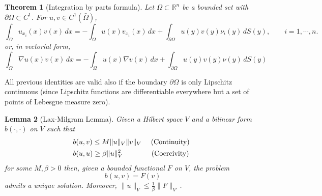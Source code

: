 \documentclass{article}
\newtheorem{thm}{Theorem}[section]
\newtheorem{lemma}[thm]{Lemma}
\begin{document}
\begin{thm}[Integration by parts formula] \label{thm:by_parts}
Let $\Omega \subset \mathbb{R}^n$ be a bounded set with $\partial\Omega \subset C^1$. For $u, v \in C^1(\bar{\Omega})$,
\[
\int_\Omega u_{x_i}(x)v(x)\,dx = -\int_\Omega u(x)v_{x_i}(x)\,dx + \int_{\partial\Omega} u(y)v(y)\nu_i(y)\,dS(y), \qquad i = 1, \cdots, n.
\]
or, in vectorial form,
\[
\int_\Omega \nabla u(x)v(x)\,dx = -\int_\Omega u(x)\nabla v(x)\,dx + \int_{\partial\Omega} u(y)v(y)\nu(y)\,dS(y)
\]
\end{thm}


All previous identities are valid also if the boundary $\partial\Omega$ is only Lipschitz continuous (since Lipschitz functions are differentiable everywhere but a set of points of Lebesgue measure zero).


\begin{lemma}[Lax-Milgram Lemma]\label{lemma:lax_mil}
    Given a Hilbert space $V$ and a bilinear form $b(\cdot, \cdot)$ on $V$ such that
    \begin{align*}
        & b(u,v) \leq M \| u\|_V \| v\|_V \quad \text{ (Continuity) }\\
        &b(u,u) \geq \beta \| u\|_V^2 \qquad \hspace{6mm} \text{ (Coercivity) }
    \end{align*}
    for some $M,\beta>0$ then, given a bounded functional $F$ on $V$, the problem
    \begin{equation*}
        b(u,v) = F(v)
    \end{equation*}
    admits a unique solution. Moreover, $\| u\|_V \leq \frac{1}{\beta} \| F\|_{V'}$.
\end{lemma}

    
\end{document}
